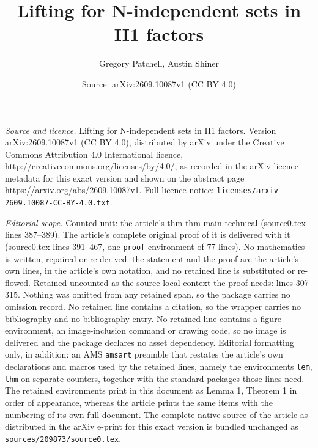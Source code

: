 \documentclass[10pt,a4paper]{amsart}
\title{Lifting for N-independent sets in II1 factors}
\author{Gregory Patchell, Austin Shiner}
\date{Source: arXiv:2609.10087v1 (CC BY 4.0)}
\begin{document}
\maketitle

\noindent\emph{Source and licence.} Lifting for N-independent sets in II1 factors. Version arXiv:2609.10087v1 (CC BY 4.0), distributed by arXiv under the Creative Commons Attribution 4.0 International licence, http://creativecommons.org/licenses/by/4.0/, as recorded in the arXiv licence metadata for this exact version and shown on the abstract page https://arxiv.org/abs/2609.10087v1. Full licence notice: \texttt{licenses/arxiv-2609.10087-CC-BY-4.0.txt}.\par\smallskip

\noindent\textit{Editorial scope.} Counted unit: the article's thm thm-main-technical (source0.tex lines 387--389). The article's complete original proof of it is delivered with it (source0.tex lines 391--467, one \texttt{proof} environment of 77 lines). No mathematics is written, repaired or re-derived: the statement and the proof are the article's own lines, in the article's own notation, and no retained line is substituted or re-flowed.  Retained uncounted as the source-local context the proof needs: lines 307--315.  Nothing was omitted from any retained span, so the package carries no omission record.  No retained line contains a citation, so the wrapper carries no bibliography and no bibliography entry.  No retained line contains a figure environment, an image-inclusion command or drawing code, so no image is delivered and the package declares no asset dependency.  Editorial formatting only, in addition: an AMS \texttt{amsart} preamble that restates the article's own declarations and macros used by the retained lines, namely the environments \texttt{lem}, \texttt{thm} on separate counters, together with the standard packages those lines need.  The retained environments print in this document as Lemma 1, Theorem 1 in order of appearance, whereas the article prints the same items with the numbering of its own full document.  The complete native source of the article as distributed in the arXiv e-print for this exact version is bundled unchanged as \texttt{sources/209873/source0.tex}.
\end{document}
